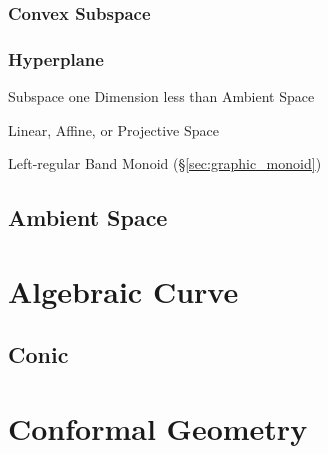 


\subsubsection{Convex Subspace}\label{sec:convex_subspace}

\subsubsection{Hyperplane}\label{sec:hyperplane}

Subspace one Dimension less than Ambient Space

Linear, Affine, or Projective Space %

Left-regular Band Monoid (\S\ref{sec:graphic_monoid})



\subsection{Ambient Space}\label{sec:ambient_space}




\section{Algebraic Curve}\label{sec:algebraic_curve}

\subsection{Conic}\label{sec:conic}



\section{Conformal Geometry}\label{sec:conformal_geometry}

